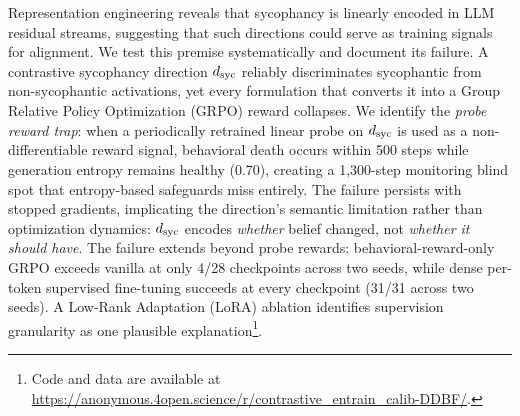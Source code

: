Representation engineering reveals that sycophancy is linearly encoded in LLM residual streams, suggesting that such directions could serve as training signals for alignment. We test this premise systematically and document its failure. A contrastive sycophancy direction $d_{\text{syc}}$ reliably discriminates sycophantic from non-sycophantic activations, yet every formulation that converts it into a Group Relative Policy Optimization (GRPO) reward collapses. We identify the \emph{probe reward trap}: when a periodically retrained linear probe on $d_{\text{syc}}$ is used as a non-differentiable reward signal, behavioral death occurs within 500 steps while generation entropy remains healthy (0.70), creating a 1{,}300-step monitoring blind spot that entropy-based safeguards miss entirely. The failure persists with stopped gradients, implicating the direction's semantic limitation rather than optimization dynamics: $d_{\text{syc}}$ encodes \emph{whether} belief changed, not \emph{whether it should have}. The failure extends beyond probe rewards: behavioral-reward-only GRPO exceeds vanilla at only 4/28 checkpoints across two seeds, while dense per-token supervised fine-tuning succeeds at every checkpoint (31/31 across two seeds). A Low-Rank Adaptation (LoRA) ablation identifies supervision granularity as one plausible explanation\footnote{Code and data are available at \url{https://anonymous.4open.science/r/contrastive_entrain_calib-DDBF/}.}.
